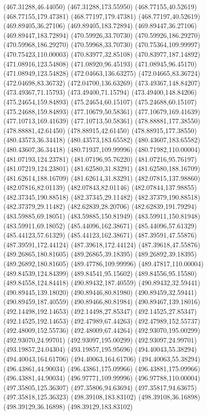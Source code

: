 {(467.31288,46.44050) (467.31288,173.55950) (468.77155,40.52619) (468.77155,179.47381) (468.77197,179.47381) (468.77197,40.52619) (469.89405,36.27106) (469.89405,183.72894)
(469.89447,36.27106) (469.89447,183.72894) (470.59926,33.70730) (470.59926,186.29270) (470.59968,186.29270) (470.59968,33.70730) (470.75364,109.99997) (470.75423,110.00003)
(470.83977,32.85108) (470.83977,187.14892) (471.08916,123.54808) (471.08920,96.45193) (471.08945,96.45170) (471.08949,123.54828) (472.04663,136.63275) (472.04665,83.36724)
(472.04698,83.36732) (472.04700,136.63269) (473.49367,148.84207) (473.49367,71.15793) (473.49400,71.15794) (473.49400,148.84206) (475.24654,159.84893) (475.24654,60.15107)
(475.24688,60.15107) (475.24688,159.84893) (477.10679,50.58361) (477.10679,169.41639) (477.10713,169.41639) (477.10713,50.58361) (478.88881,177.38550) (478.88881,42.61450)
(478.88915,42.61450) (478.88915,177.38550) (480.43573,36.34418) (480.43573,183.65582) (480.43607,183.65582) (480.43607,36.34418) (480.71937,109.99996) (480.71982,110.00004)
(481.07193,124.23781) (481.07196,95.76220) (481.07216,95.76197) (481.07219,124.23801) (481.62580,31.83291) (481.62580,188.16709) (481.62614,188.16709) (481.62614,31.83291)
(482.07815,137.98860) (482.07816,82.01139) (482.07843,82.01146) (482.07844,137.98855) (482.37345,190.88518) (482.37345,29.11482) (482.37379,190.88518) (482.37379,29.11482)
(482.62839,28.20706) (482.62839,191.79294) (483.59885,69.18051) (483.59885,150.81949) (483.59911,150.81948) (483.59911,69.18052) (485.44096,162.38671) (485.44096,57.61329)
(485.44123,57.61329) (485.44123,162.38671) (487.39591,47.55876) (487.39591,172.44124) (487.39618,172.44124) (487.39618,47.55876) (489.26865,180.81605) (489.26865,39.18395)
(489.26892,39.18395) (489.26892,180.81605) (489.47786,109.99996) (489.47817,110.00004) (489.84539,124.84399) (489.84541,95.15602) (489.84556,95.15580) (489.84558,124.84418)
(490.89432,187.40559) (490.89432,32.59441) (490.89445,139.18020) (490.89446,80.81980) (490.89459,32.59441) (490.89459,187.40559) (490.89466,80.81984) (490.89467,139.18016)
(492.14498,192.14653) (492.14498,27.85347) (492.14525,27.85347) (492.14525,192.14653) (492.47989,67.44263) (492.47989,152.55737) (492.48009,152.55736) (492.48009,67.44264)
(492.93070,195.00299) (492.93070,24.99701) (492.93097,195.00299) (492.93097,24.99701) (493.19857,24.04304) (493.19857,195.95696) (494.40043,55.38294) (494.40043,164.61706)
(494.40063,164.61706) (494.40063,55.38294) (496.43861,44.90034) (496.43861,175.09966) (496.43881,175.09966) (496.43881,44.90034) (496.97771,109.99996) (496.97788,110.00004)
(497.35805,125.36307) (497.35806,94.63694) (497.35817,94.63675) (497.35818,125.36323) (498.39108,183.83102) (498.39108,36.16898) (498.39129,36.16898) (498.39129,183.83102)
}

